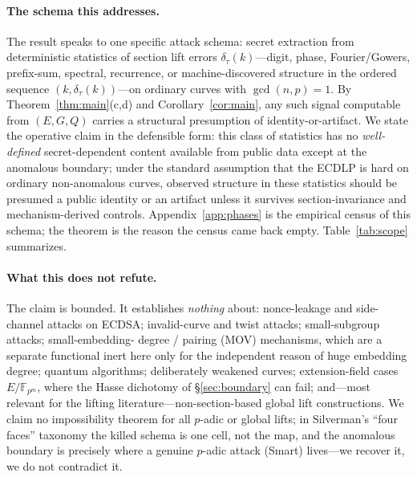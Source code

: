 \documentclass[11pt]{article}
\theoremstyle{definition}
\begin{document}
\paragraph{The schema this addresses.} The result speaks to one specific
attack schema: secret extraction from deterministic statistics of section
lift errors $\delta_\tau(k)$---digit, phase, Fourier/Gowers, prefix-sum,
spectral, recurrence, or machine-discovered structure in the ordered
sequence $(k,\delta_\tau(k))$---on ordinary curves with $\gcd(n,p)=1$. By
Theorem~\ref{thm:main}(c,d) and Corollary~\ref{cor:main}, any such signal
computable from $(E,G,Q)$ carries a structural presumption of
identity-or-artifact. We state the operative claim in the defensible form:
this class of statistics has no \emph{well-defined} secret-dependent
content available from public data except at the anomalous boundary; under
the standard assumption that the ECDLP is hard on ordinary non-anomalous
curves, observed structure in these statistics should be presumed a public
identity or an artifact unless it survives section-invariance and
mechanism-derived controls. Appendix~\ref{app:phases} is the empirical
census of this schema; the theorem is the reason the census came back
empty. Table~\ref{tab:scope} summarizes.

\paragraph{What this does not refute.} The claim is bounded. It establishes
\emph{nothing} about: nonce-leakage and side-channel attacks on ECDSA;
invalid-curve and twist attacks; small-subgroup attacks; small-embedding-%
degree / pairing (MOV) mechanisms, which are a separate functional inert
here only for the independent reason of huge embedding degree; quantum
algorithms; deliberately weakened curves; extension-field cases
$E/\mathbb F_{p^m}$, where the Hasse dichotomy of \S\ref{sec:boundary} can
fail; and---most relevant for the lifting literature---non-section-based
global lift constructions. We claim no impossibility theorem for all
$p$-adic or global lifts; in Silverman's ``four faces'' taxonomy
\cite{silvermanlift,silverman4faces} the killed schema is one cell, not
the map, and the anomalous boundary is precisely where a genuine $p$-adic
attack (Smart) lives---we recover it, we do not contradict it.
\end{document}
